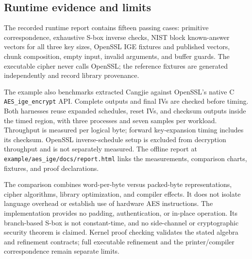\subsection{Runtime evidence and limits}

The recorded runtime report contains fifteen passing cases: primitive
correspondence, exhaustive S-box inverse checks, NIST block known-answer
vectors for all three key sizes, OpenSSL IGE fixtures and published vectors,
chunk composition, empty input, invalid arguments, and buffer guards.
The executable cipher never calls OpenSSL; the reference fixtures are
generated independently and record library provenance.

The example also benchmarks extracted Cangjie against OpenSSL's native C
\texttt{AES\_ige\_encrypt} API. Complete outputs and final IVs are checked
before timing. Both harnesses reuse expanded schedules, reset IVs, and
checksum outputs inside the timed region, with three processes and seven
samples per workload. Throughput is measured per logical byte; forward
key-expansion timing includes its checksum. OpenSSL inverse-schedule setup
is excluded from decryption throughput and is not separately measured.
The offline report at \texttt{example/aes\_ige/docs/report.html} links the
measurements, comparison charts, fixtures, and proof declarations.

The comparison combines word-per-byte versus packed-byte representations,
cipher algorithms, library optimization, and compiler effects. It does not
isolate language overhead or establish use of hardware AES instructions.
The implementation provides no padding, authentication, or in-place
operation. Its branch-based S-box is not constant-time, and no side-channel
or cryptographic security theorem is claimed. Kernel proof checking
validates the stated algebra and refinement contracts; full executable
refinement and the printer/compiler correspondence remain separate limits.
